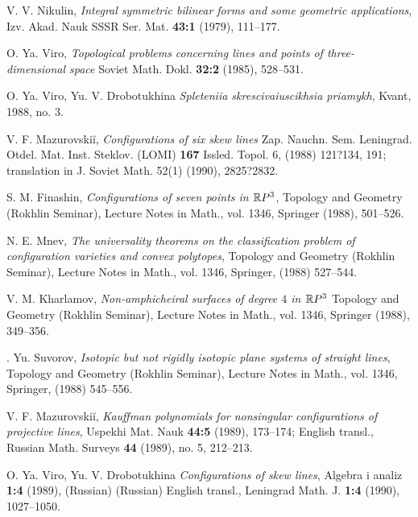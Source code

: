 \documentclass{article}
\begin{document}
\begin{thebibliography}{9999999}

  V. V. Nikulin, 
{\it Integral symmetric bilinear forms and some geometric 
applications}, Izv. Akad. Nauk SSSR Ser. 
Mat. {\bf43:1} (1979), 111--177.


 O. Ya. Viro, {\it Topological problems concerning lines 
and points of three-dimensional space}  Soviet Math. Dokl. 
{\bf 32:2} (1985), 528--531. 

 O. Ya. Viro, Yu. V. Drobotukhina  {\it Spleteniia 
skrescivaiuscikhsia priamykh}, Kvant, 1988, no. 3.

 V. F. Mazurovski\u{i}, 
{\it Configurations of six skew lines}  Zap.  Nauchn. Sem. 
Leningrad. Otdel. Mat. Inst. Steklov. (LOMI) {\bf167} 
 Issled. Topol. 6, (1988) 121?134, 191; translation in J. Soviet Math. 52(1) 
(1990), 2825?2832.

 S.  M.  Finashin, 
{\it Configurations of seven points in $\mathbb{R} P^3$},
Topology and Geometry (Rokhlin Seminar), Lecture Notes in Math.,
vol. 1346, 
Springer (1988), 501--526.

  N. E. Mnev, 
{\it The universality theorems on the classification problem of 
configuration varieties and convex polytopes}, Topology and 
Geometry (Rokhlin Seminar), Lecture Notes in Math., vol. 1346, 
Springer, (1988) 527--544.

  V. M. Kharlamov, 
{\it Non-amphicheiral surfaces of degree $4$ in $\mathbb{R} P^3$} Topology 
and Geometry (Rokhlin Seminar), Lecture Notes in Math., vol. 1346, 
Springer (1988), 349--356.

. Yu. Suvorov, 
{\it Isotopic but not rigidly isotopic plane systems of straight 
lines}, Topology and Geometry (Rokhlin Seminar), Lecture 
Notes in Math., vol. 1346, Springer, (1988)
545--556.



V. F. Mazurovski\u{i}, {\it Kauffman polynomials for nonsingular
configurations of projective lines},
Uspekhi Mat. Nauk {\bf 44:5} (1989), 173--174; English transl., Russian
Math. Surveys {\bf 44} (1989), no. 5, 212--213.

  O. Ya. Viro, Yu. V. Drobotukhina  {\it Configurations of 
skew lines}, Algebra i analiz {\bf1:4} (1989),	 (Russian)
(Russian) English transl., Leningrad Math. J. {\bf 1:4} (1990), 
1027--1050.


\end{thebibliography}
\end{document}
